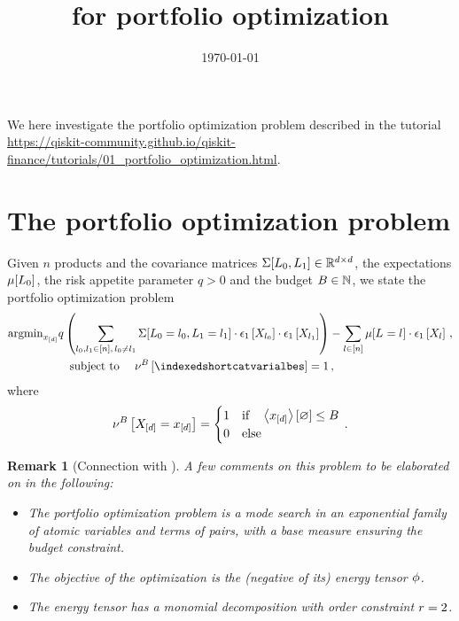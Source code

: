\documentclass[aps,onecolumn,nofootinbib,pra]{article}
\newtheorem{remark}{Remark}
\begin{document}
    \title{\tnreason for portfolio optimization}

    \maketitle
    \date{\today}

    We here investigate the portfolio optimization problem described in the tutorial \url{https://qiskit-community.github.io/qiskit-finance/tutorials/01_portfolio_optimization.html}.


    \section{The portfolio optimization problem}

    \newcommand{\productsnum}{n}


    Given $\productsnum$ products and the covariance matrices $\Sigma[L_{0},L_{1}]\in\mathbb{R}^{d\times d}$, the expectations $\mu[L_{0}]$, the risk appetite parameter $q>0$ and the budget $B\in\mathbb{N}$, we state the portfolio optimization problem
    \begin{align}
        \argmin_{\shortcatindices} &
        q \left(\sum_{\selindexof{0},\selindexof{1}\in[\productsnum] , \, \selindexof{0}\neq\selindexof{1}}
        \Sigma[\indexedselvariableof{0},\indexedselvariableof{1}] \cdot \tbasisat{\catvariableof{\selindexof{0}}}\cdot \tbasisat{\catvariableof{\selindexof{1}}}\right)
        - \sum_{\selindex\in[\productsnum]} \mu[\indexedselvariable] \cdot \tbasisat{\catvariableof{\selindex}} \, , \\
        & \quad \text{subject to } \quad \basemeasureofat{B}{\indexedshortcatvarialbes} = 1 \, ,%
    \end{align}
    where
    \begin{align*}
        \nu^{B}\left[X_{[d]}=x_{[d]}\right] =
        \begin{cases}
            1 & \text{if}\quad \left\langle x_{[d]}\right\rangle \left[ \varnothing \right] \leq B \\
            0 & \text{else}
        \end{cases} \, .
    \end{align*}

    \begin{remark}[Connection with \tnreason]
        A few comments on this problem to be elaborated on in the following:
        \begin{itemize}
            \item  The portfolio optimization problem is a mode search in an exponential family of atomic variables and terms of pairs, with a base measure ensuring the budget constraint.
            \item The objective of the optimization is the (negative of its) energy tensor $\phi$.
            \item The energy tensor has a monomial decomposition with order constraint $r=2$.
        \end{itemize}
    \end{remark}
\end{document}

